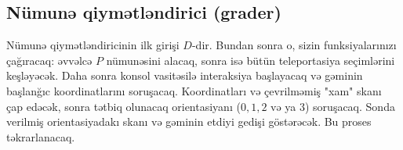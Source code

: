 \documentclass[12pt]{article}
\begin{document}
\subsection{Nümunə qiymətləndirici (grader)}

Nümunə qiymətləndiricinin ilk girişi $D$-dir. Bundan sonra o, sizin funksiyalarınızı çağıracaq: əvvəlcə $P$ nümunəsini alacaq, sonra isə bütün teleportasiya seçimlərini keşləyəcək. Daha sonra konsol vasitəsilə interaksiya başlayacaq və gəminin başlanğıc koordinatlarını soruşacaq. Koordinatları və çevrilməmiş "xam" skanı çap edəcək, sonra tətbiq olunacaq orientasiyanı ($0, 1, 2$ və ya $3$) soruşacaq. Sonda verilmiş orientasiyadakı skanı və gəminin etdiyi gedişi göstərəcək. Bu proses təkrarlanacaq.
\end{document}
